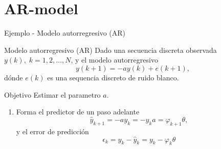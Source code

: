 \documentclass[presentation,aspectratio=169]{beamer}
\begin{document}
\section{AR-model}
\label{sec:org4f000d2}

\begin{frame}[label={sec:org023cc94}]{Ejemplo - Modelo autorregresivo (AR)}
\end{frame}
\begin{frame}[label={sec:org0019461}]{Modelo autorregresivo (AR)}
Dado una secuencia discreta observada \(y(k), \; k=1,2,\ldots,N\), y el modelo autorregresivo
\[ y(k+1) = -ay(k) + e(k+1),\]
dónde \(e(k)\) es una sequencia discreto de ruido blanco.

\alert{Objetivo} Estimar el parametro \(a\).

\begin{enumerate}
\item Forma el predictor de un paso adelante \[\hat{y}_{k+1} = -ay_k=-y_ka = \varphi_{k+1} \theta,\] y el error de predicción \[\epsilon_k = y_k - \hat{y}_k = y_k - \varphi_k \theta\]
\end{enumerate}
\end{frame}
\end{document}
